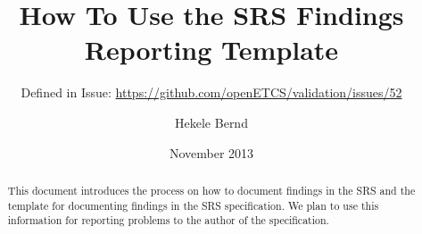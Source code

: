 \documentclass{template/openetcs_article}
\begin{document}
\frontmatter
{}







\title{How To Use the SRS Findings Reporting Template}

\subtitle{Defined in Issue: \url{https://github.com/openETCS/validation/issues/52}}

\date{November 2013}


\author{Hekele Bernd}






\begin{abstract}
This document introduces the process on how to document findings in the SRS and the template for documenting findings in  the SRS specification. We plan to use this information for reporting problems to the author of the specification. 
  
\end{abstract}

\maketitle

\end{document}
